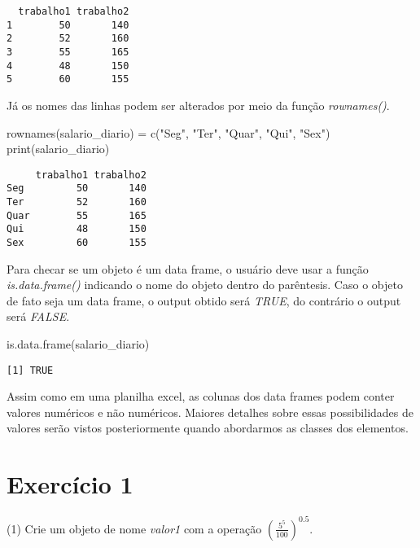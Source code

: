 \documentclass[
  letterpaper,
  DIV=11,
  numbers=noendperiod]{scrreprt}
\newenvironment{Shaded}{\begin{snugshade}}{\end{snugshade}}
\newcommand{\FunctionTok}[1]{\textcolor[rgb]{0.28,0.35,0.67}{#1}}
\newcommand{\NormalTok}[1]{\textcolor[rgb]{0.00,0.23,0.31}{#1}}
\newcommand{\OtherTok}[1]{\textcolor[rgb]{0.00,0.23,0.31}{#1}}
\newcommand{\StringTok}[1]{\textcolor[rgb]{0.13,0.47,0.30}{#1}}
\begin{document}
\begin{verbatim}
  trabalho1 trabalho2
1        50       140
2        52       160
3        55       165
4        48       150
5        60       155
\end{verbatim}

Já os nomes das linhas podem ser alterados por meio da função
\emph{rownames()}.

\begin{Shaded}
\begin{Highlighting}[]
\FunctionTok{rownames}\NormalTok{(salario\_diario) }\OtherTok{=} \FunctionTok{c}\NormalTok{(}\StringTok{"Seg"}\NormalTok{, }\StringTok{"Ter"}\NormalTok{, }\StringTok{"Quar"}\NormalTok{, }\StringTok{"Qui"}\NormalTok{, }\StringTok{"Sex"}\NormalTok{)}
\FunctionTok{print}\NormalTok{(salario\_diario)}
\end{Highlighting}
\end{Shaded}

\begin{verbatim}
     trabalho1 trabalho2
Seg         50       140
Ter         52       160
Quar        55       165
Qui         48       150
Sex         60       155
\end{verbatim}

Para checar se um objeto é um data frame, o usuário deve usar a função
\emph{is.data.frame()} indicando o nome do objeto dentro do parêntesis.
Caso o objeto de fato seja um data frame, o output obtido será
\emph{TRUE}, do contrário o output será \emph{FALSE}.

\begin{Shaded}
\begin{Highlighting}[]
\FunctionTok{is.data.frame}\NormalTok{(salario\_diario)}
\end{Highlighting}
\end{Shaded}

\begin{verbatim}
[1] TRUE
\end{verbatim}

Assim como em uma planilha excel, as colunas dos data frames podem
conter valores numéricos e não numéricos. Maiores detalhes sobre essas
possibilidades de valores serão vistos posteriormente quando abordarmos
as classes dos elementos.

\section{Exercício 1}\label{exercuxedcio-1}

(1) Crie um objeto de nome \emph{valor1} com a operação
\(\left(\frac{5^5}{100}\right)^{0.5}\).
\end{document}
